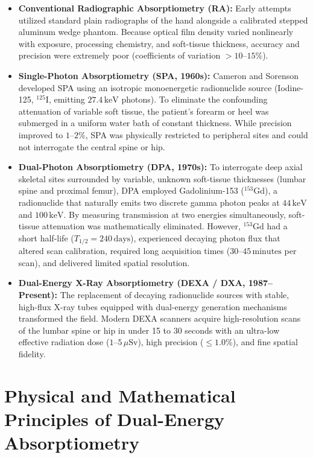 \documentclass[11pt,a4paper]{article}
\begin{document}
\begin{itemize}[leftmargin=*]
    \item \textbf{Conventional Radiographic Absorptiometry (RA):} Early attempts utilized standard plain radiographs of the hand alongside a calibrated stepped aluminum wedge phantom. Because optical film density varied nonlinearly with exposure, processing chemistry, and soft-tissue thickness, accuracy and precision were extremely poor (coefficients of variation $> 10\text{--}15\%$).
    \item \textbf{Single-Photon Absorptiometry (SPA, 1960s):} Cameron and Sorenson developed SPA using an isotropic monoenergetic radionuclide source (Iodine-125, $^{125}\text{I}$, emitting $27.4\,\text{keV}$ photons). To eliminate the confounding attenuation of variable soft tissue, the patient's forearm or heel was submerged in a uniform water bath of constant thickness. While precision improved to $1\text{--}2\%$, SPA was physically restricted to peripheral sites and could not interrogate the central spine or hip.
    \item \textbf{Dual-Photon Absorptiometry (DPA, 1970s):} To interrogate deep axial skeletal sites surrounded by variable, unknown soft-tissue thicknesses (lumbar spine and proximal femur), DPA employed Gadolinium-153 ($^{153}\text{Gd}$), a radionuclide that naturally emits two discrete gamma photon peaks at $44\,\text{keV}$ and $100\,\text{keV}$. By measuring transmission at two energies simultaneously, soft-tissue attenuation was mathematically eliminated. However, $^{153}\text{Gd}$ had a short half-life ($T_{1/2} = 240\,\text{days}$), experienced decaying photon flux that altered scan calibration, required long acquisition times ($30\text{--}45\,\text{minutes}$ per scan), and delivered limited spatial resolution.
    \item \textbf{Dual-Energy X-Ray Absorptiometry (DEXA / DXA, 1987--Present):} The replacement of decaying radionuclide sources with stable, high-flux X-ray tubes equipped with dual-energy generation mechanisms transformed the field. Modern DEXA scanners acquire high-resolution scans of the lumbar spine or hip in under 15 to 30 seconds with an ultra-low effective radiation dose ($1\text{--}5\,\mu\text{Sv}$), high precision ($\le 1.0\%$), and fine spatial fidelity.
\end{itemize}

\newpage
\section{Physical and Mathematical Principles of Dual-Energy Absorptiometry}
\end{document}
